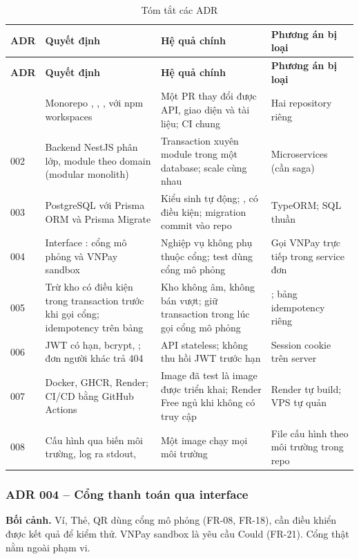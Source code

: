 \begin{longtable}{@{}L{1.1cm}L{4.2cm}L{4.4cm}L{4.1cm}@{}}
\caption{Tóm tắt các ADR}\label{tab:adr}\\
\toprule
\textbf{ADR} & \textbf{Quyết định} & \textbf{Hệ quả chính} & \textbf{Phương án bị loại} \\ \midrule \endfirsthead
\toprule \textbf{ADR} & \textbf{Quyết định} & \textbf{Hệ quả chính} & \textbf{Phương án bị loại} \\ \midrule \endhead
\bottomrule {} & Monorepo , , ,  với npm workspaces & Một PR thay đổi được API, giao diện và tài liệu; CI chung & Hai repository riêng \\
002 & Backend NestJS phân lớp, module theo domain (modular monolith) & Transaction xuyên module trong một database; scale cùng nhau & Microservices (cần saga) \\
003 & PostgreSQL với Prisma ORM và Prisma Migrate & Kiểu sinh tự động; ,  có điều kiện; migration commit vào repo & TypeORM; SQL thuần \\
004 & Interface : cổng mô phỏng và VNPay sandbox & Nghiệp vụ không phụ thuộc cổng; test dùng cổng mô phỏng & Gọi VNPay trực tiếp trong service đơn \\
005 & Trừ kho có điều kiện trong transaction trước khi gọi cổng; idempotency trên bảng  & Kho không âm, không bán vượt; giữ transaction trong lúc gọi cổng mô phỏng & ; bảng idempotency riêng \\
006 & JWT có hạn, bcrypt, ; đơn người khác trả 404 & API stateless; không thu hồi JWT trước hạn & Session cookie trên server \\
007 & Docker, GHCR, Render; CI/CD bằng GitHub Actions & Image đã test là image được triển khai; Render Free ngủ khi không có truy cập & Render tự build; VPS tự quản \\
008 & Cấu hình qua biến môi trường, log ra stdout,  & Một image chạy mọi môi trường & File cấu hình theo môi trường trong repo \\
\end{longtable}

\subsubsection{ADR 004 -- Cổng thanh toán qua interface}
\textbf{Bối cảnh.} Ví, Thẻ, QR dùng cổng mô phỏng (FR-08, FR-18), cần điều khiển được kết quả để kiểm thử. VNPay sandbox là yêu cầu Could (FR-21). Cổng thật nằm ngoài phạm vi.

